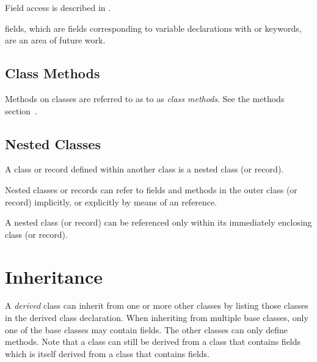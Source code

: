 Field access is described in .

\begin{future}
 fields, which are fields corresponding to variable declarations
with  or  keywords, are an area of future work.
\end{future}

\subsection{Class Methods}
\label{Class_Methods}

Methods on classes are referred to as to as \emph{class methods}.
See the methods section~.

\subsection{Nested Classes}
\label{Nested_Classes}

A class or record defined within another class is a nested class (or record).

Nested classes or records can refer to fields and methods in the outer class (or
record) implicitly, or explicitly by means of an  reference.

A nested class (or record) can be referenced only within
its immediately enclosing class (or record).

\section{Inheritance}
\label{Inheritance}

A \emph{derived} class can inherit from one or more other classes by
listing those classes in the derived class declaration.
When inheriting from multiple base classes, only one of the base classes
may contain fields.  The other classes can only define methods.  Note
that a class can still be derived from a class that contains fields
which is itself derived from a class that contains fields.  

